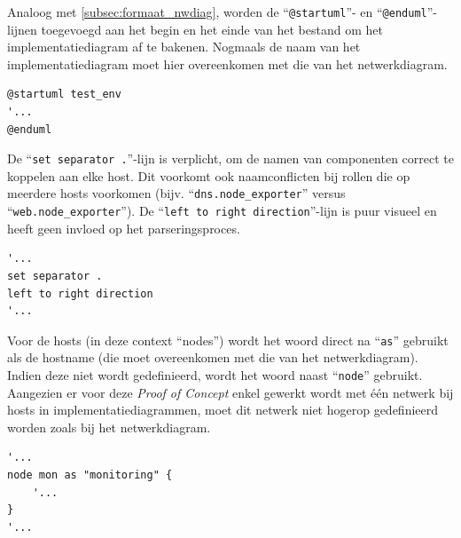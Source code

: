 Analoog met \autoref{subsec:formaat_nwdiag}, worden de ``\texttt{@startuml}''- en ``\texttt{@enduml}''-lijnen toegevoegd aan het begin en het einde van het bestand om het implementatiediagram af te bakenen. Nogmaals de naam van het implementatiediagram moet hier overeenkomen met die van het netwerkdiagram.

\begin{codeblockfixed}
  \begin{codeblock}
    \begin{lstlisting}[language=plantuml]
@startuml test_env
'...
@enduml
\end{lstlisting}
    \caption[Afbakening van implementatiediagram]{Afbakening van het implementatiediagram met ``\texttt{@startuml}'' \& ``\texttt{@enduml}''.}
    \label{code:vb_uml_afbakening}
  \end{codeblock}
\end{codeblockfixed}

De ``\texttt{set separator .}''-lijn is verplicht, om de namen van componenten correct te koppelen aan elke host. Dit voorkomt ook naamconflicten bij rollen die op meerdere hosts voorkomen (bijv. ``\texttt{dns.node\_exporter}'' versus ``\texttt{web.node\_exporter}''). De ``\texttt{left to right direction}''-lijn is puur visueel en heeft geen invloed op het parseringsproces.

\begin{codeblockfixed}
  \begin{codeblock}
    \begin{lstlisting}[language=plantuml]
'...
set separator .
left to right direction
'...
\end{lstlisting}
    \caption[``\texttt{set separator .}'' \& ``\texttt{left to right direction}'']{De ``\texttt{set separator .}''- en ``\texttt{left to right direction}''-lijnen.}
    \label{code:vb_uml_separator}
  \end{codeblock}
\end{codeblockfixed}

Voor de hosts (in deze context ``nodes'') wordt het woord direct na ``\texttt{as}'' gebruikt als de hostname (die moet overeenkomen met die van het netwerkdiagram). Indien deze niet wordt gedefinieerd, wordt het woord naast ``\texttt{node}'' gebruikt. Aangezien er voor deze \emph{Proof of Concept} enkel gewerkt wordt met één netwerk bij hosts in implementatiediagrammen, moet dit netwerk niet hogerop gedefinieerd worden zoals bij het netwerkdiagram.

\begin{codeblockfixed}
  \begin{codeblock}
    \begin{lstlisting}[language=plantuml]
'...
node mon as "monitoring" {
    '...
}
'...
\end{lstlisting}
    \caption[Hostdefinitie in implementatiediagram]{Definitie van hosts in het implementatiediagram.}
    \label{code:vb_uml_hosts}
  \end{codeblock}
\end{codeblockfixed}

